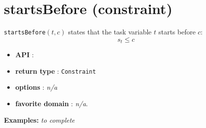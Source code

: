 \section{startsBefore (constraint)}\label{startsbefore:startsbeforeconstraint}\hypertarget{startsbefore:startsbeforeconstraint}{}
\begin{notedef}
  \texttt{startsBefore}$(t,c)$ states that the task variable $t$ starts before $c$:
  $$s_t \le c$$
\end{notedef}

\begin{itemize}
	\item \textbf{API} :
	\item \textbf{return type} : \texttt{Constraint}
	\item \textbf{options} : \emph{n/a}
	\item \textbf{favorite domain} : \emph{n/a}.
\end{itemize}

\textbf{Examples:}
%
\emph{to complete}
